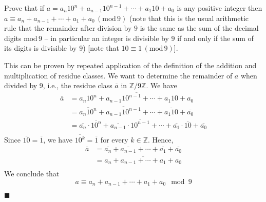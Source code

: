 \documentclass[12pt]{article}
\renewcommand{\qed}{\hfill$\blacksquare$}
\renewenvironment{proof}{\begin{addmargin}[1em]{0em}\begin{newproof}}{\end{newproof}\end{addmargin}\qed}
\newenvironment{problem}[2][Exercise]{\begin{trivlist}
\item[\hskip \labelsep {\bfseries #1}\hskip \labelsep {\bfseries #2.}]}{\end{trivlist}}
\begin{document}
\begin{problem}{0.3.3}
Prove that if $a=a_n 10^n + a_{n-1}10^{n-1} + \cdots + a_1 10 + a_0$ is any positive integer then $a \equiv a_n + a_{n-1} + \cdots + a_1 + a_0 \, \left(\text{mod}\, 9\right)$ (note that this is the usual arithmetic rule that the remainder after division by $9$ is the same as the sum of the decimal digits $\text{mod}\, 9$ -- in particular an integer is divisible by $9$ if and only if the sum of its digits is divisible by $9$) [note that $10 \equiv 1 \, \left(\text{mod} \, 9\right)$].
\end{problem}
\begin{proof}
This can be proven by repeated application of the definition of the addition and multiplication of residue classes. We want to determine the remainder of $a$ when divided by $9$, i.e., the residue class $\overline{a}$ in $\mathbb{Z}/9\mathbb{Z}$. We have
\begin{equation*}
	\begin{split}
		\overline{a} & = \overline{a_n 10^n + a_{n-1}10^{n-1} + \cdots + a_1 10 + a_0} \\ 
		& = \overline{a_n 10^n} + \overline{a_{n-1}10^{n-1}} + \cdots + \overline{a_1 10} + \overline{a_0} \\
		& = \overline{a_n} \cdot \overline{10^n} + \overline{a_{n-1}}\cdot  \overline{10^{n-1}} + \cdots + \overline{a_1}\cdot \overline{10} + \overline{a_0} \\
	\end{split}
\end{equation*} Since $\overline{10} = \overline{1}$, we have $\overline{10^k} = \overline{1}$ for every $k\in \mathbb{Z}$. Hence,
\begin{equation*}
	\begin{split}
		\overline{a} & = \overline{a_n} + \overline{a_{n-1}} + \cdots + \overline{a_1} + \overline{a_0} \\
		& = \overline{a_n + a_{n-1} + \cdots + a_1 + a_0 } \\
	\end{split}
\end{equation*} We conclude that \[ a \equiv a_n + a_{n-1} + \cdots + a_1 + a_0 \mod 9 \]
\end{proof}
\end{document}
